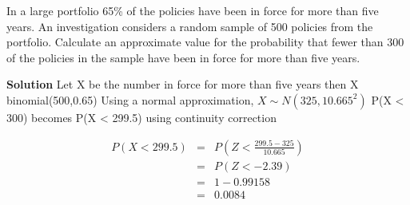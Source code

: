 \documentclass[a4paper,12pt]{article}
\begin{document}
In a large portfolio 65\% of the policies have been in force for more than five years. An investigation considers a random sample of 500 policies from the portfolio.
Calculate an approximate value for the probability that fewer than 300 of the policies in the sample have been in force for more than five years.

\noindent \textbf{Solution}
Let X be the number in force for more than five years
then X ~ binomial(500,0.65)
Using a normal approximation, $X \sim N(325, 10.665^2 )$
P(X < 300) becomes P(X < 299.5) using continuity correction

\begin{eqnarray*} 
P(X < 299.5) &=& P \left( Z < \frac{299.5 − 325}{10.665} \right)\\
&=& P ( Z < − 2.39)\\
&=& 1 − 0.99158 \\ 
&=& 0.0084\\
\end{eqnarray*}


\end{document}
